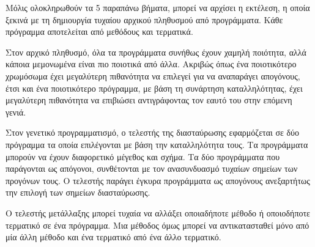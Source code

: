 Μόλις ολοκληρωθούν τα 5 παραπάνω βήματα, μπορεί να αρχίσει η εκτέλεση, η οποία ξεκινά με τη δημιουργία τυχαίου αρχικού πληθυσμού από προγράμματα. Κάθε πρόγραμμα αποτελείται από μεθόδους και τερματικά.

Στον αρχικό πληθυσμό, όλα τα προγράμματα συνήθως έχουν χαμηλή ποιότητα, αλλά κάποια μεμονωμένα είναι πιο ποιοτικά από άλλα. Ακριβώς όπως ένα ποιοτικότερο χρωμόσωμα έχει μεγαλύτερη πιθανότητα να επιλεγεί για να αναπαράγει απογόνους, έτσι και ένα ποιοτικότερο πρόγραμμα, με βάση τη συνάρτηση καταλληλότητας, έχει μεγαλύτερη πιθανότητα να επιβιώσει αντιγράφοντας τον εαυτό του στην επόμενη γενιά.

Στον γενετικό προγραμματισμό, ο τελεστής της διασταύρωσης εφαρμόζεται σε δύο πρόγραμμα τα οποία επιλέγονται με βάση την καταλληλότητα τους. Τα προγράμματα μπορούν να έχουν διαφορετικό μέγεθος και σχήμα. Τα δύο προγράμματα που παράγονται ως απόγονοι, συνθέτονται με τον ανασυνδυασμό τυχαίων σημείων των προγόνων τους. Ο τελεστής παράγει έγκυρα προγράμματα ως απογόνους ανεξαρτήτως την επιλογή των σημείων διασταύρωσης.

Ο τελεστής μετάλλαξης μπορεί τυχαία να αλλάξει οποιαδήποτε μέθοδο ή οποιοδήποτε τερματικό σε ένα πρόγραμμα. Μια μέθοδος όμως μπορεί να αντικατασταθεί μόνο από μία άλλη μέθοδο και ένα τερματικό από ένα άλλο τερματικό.
